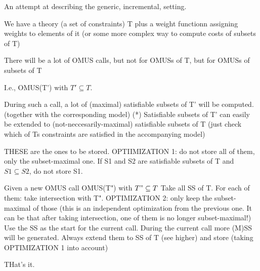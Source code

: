 An attempt at describing the generic, incremental, setting.

 

We have a theory (a set of constraints) T plus a weight functionn assigning weights to elements of it (or some more complex way to compute costs of subsets of T) 

 


There will be a lot of OMUS calls, but not for OMUSs of T, but for OMUSs of subsets of T

 

I.e.,  
OMUS(T') with $T'\subseteq T.$

 

During such a call, a lot of 
 (maximal) satisfiable subsets 
 of T' will be computed.  (together with the corresponding model)
 (*) Satisfiable subsets of T' can easily be extended to (not-neccesarily-maximal) satisfiable subsets of T (just check which of Ts constraints are satisfied in the accompanying model) 
 
THESE are the ones to be stored. 
  OPTIIMIZATION 1: do not store all of them, only the subset-maximal one. If S1 and S2 are satisfiable subsets of T and $S1 \subseteq S2$, do not store S1. 

 


Given a new OMUS call OMUS(T") with $T"\subseteq T$
Take all SS of T.
For each of them: take intersection with T". 
    OPTIMIZATION 2: only keep the subset-maximal of those 
    (this is an independent optimization from the previous one. It can be that after taking intersection, one of them is no longer subset-maximal!) 
Use the SS as the start for the current call. During the current call more (M)SS will be generated. Always extend them to SS of T (see higher) and store (taking OPTIMIZATION 1 into account)     

 


THat's it. 
